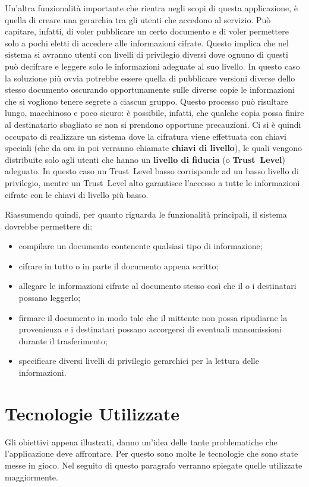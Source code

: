 Un'altra funzionalità importante che rientra negli scopi di questa applicazione, è quella di creare una gerarchia tra gli utenti che accedono al servizio. 
Può capitare, infatti, di voler pubblicare un certo documento e di voler permettere solo a pochi eletti di accedere alle informazioni cifrate. Questo implica che nel sistema si avranno utenti con livelli di privilegio diversi dove ognuno di questi può decifrare e leggere solo le informazioni adeguate al suo livello.
In questo caso la soluzione più ovvia potrebbe essere quella di pubblicare versioni diverse dello stesso documento oscurando opportunamente sulle diverse copie le informazioni che si vogliono tenere segrete a ciascun gruppo. Questo processo può risultare lungo, macchinoso e poco sicuro: è possibile, infatti, che qualche copia possa finire al destinatario sbagliato se non si prendono opportune precauzioni.
Ci si è quindi occupato di realizzare un sistema dove la cifratura viene effettuata con chiavi speciali (che da ora in poi verranno chiamate \textbf{chiavi di livello}), le quali vengono distribuite solo agli utenti che hanno un \textbf{livello di fiducia} (o \textbf{Trust~Level}) adeguato. In questo caso un Trust~Level basso corrisponde ad un basso livello di privilegio, mentre un Trust~Level alto garantisce l'accesso a tutte le informazioni cifrate con le chiavi di livello più basso.

Riassumendo quindi, per quanto riguarda le funzionalità principali, il sistema dovrebbe permettere di:
\begin{itemize}
	\item compilare un documento contenente qualsiasi tipo di informazione;
	\item cifrare in tutto o in parte il documento appena scritto;
	\item allegare le informazioni cifrate al documento stesso così che il o i destinatari possano leggerlo;
	\item firmare il documento in modo tale che il mittente non possa ripudiarne la provenienza e i destinatari possano accorgersi di eventuali manomissioni durante il trasferimento;
	\item specificare diversi livelli di privilegio gerarchici per la lettura delle informazioni.
\end{itemize}

\section{Tecnologie Utilizzate}
	\label{sec:tecnologie}
Gli obiettivi appena illustrati, danno un'idea delle tante problematiche che l'applicazione deve affrontare. Per questo sono molte le tecnologie che sono state messe in gioco. Nel seguito di questo paragrafo verranno spiegate quelle utilizzate maggiormente.

